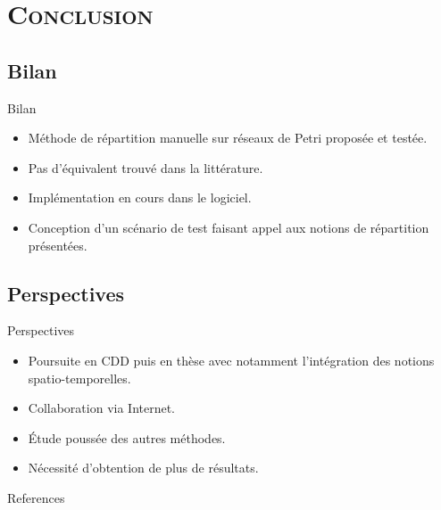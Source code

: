 \section{\scshape Conclusion}
\subsection*{Bilan}
\begin{frame}{Bilan}
	\begin{itemize}
	\item Méthode de répartition manuelle sur réseaux de Petri proposée et testée.
	
	\item Pas d'équivalent trouvé dans la littérature.
	
	\item Implémentation en cours dans le logiciel.
	
	\item Conception d'un scénario de test faisant appel aux notions de répartition présentées.		
	\end{itemize}
\end{frame}

\subsection*{Perspectives}
\begin{frame}{Perspectives}
	\begin{itemize}
		\item Poursuite en \textsc{CDD} puis en thèse avec notamment l'intégration des notions spatio-temporelles.
			
		\item Collaboration via Internet.
			
		\item Étude poussée des autres méthodes.
			
		\item Nécessité d'obtention de plus de résultats.
	\end{itemize}
\end{frame}


{\small
\begin{frame}[allowframebreaks]{References}
	
	
	
	
\end{frame}
}